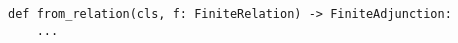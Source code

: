 \begin{verbatim}
def from_relation(cls, f: FiniteRelation) -> FiniteAdjunction:
    ...
\end{verbatim}
